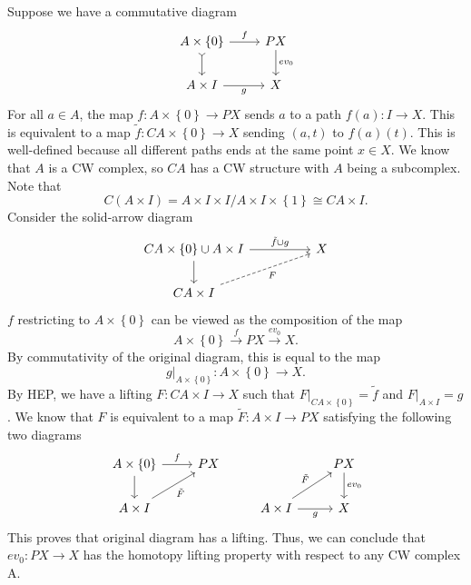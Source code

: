 \documentclass[letterpaper, 12pt]{article}
\begin{document}
\begin{solution}
Suppose we have a commutative diagram 
\[\begin{tikzcd}
	{A\times \left\{0\right\}} & PX \\
	{A\times I} & X
	\arrow["f", from=1-1, to=1-2]
	\arrow[tail, from=1-1, to=2-1]
	\arrow["{ev_0}", from=1-2, to=2-2]
	\arrow["g"', from=2-1, to=2-2]
\end{tikzcd}\]
For all \(a\in A\), the map \(f:A\times \left\{ 0 \right\}\rightarrow PX\) sends \(a\) to a path \(f(a):I\rightarrow X\). This is equivalent to a map \(\tilde{f}:CA\times \left\{ 0 \right\}\rightarrow X\) sending \((a,t)\) to \(f(a)(t)\). This is well-defined because all different paths ends at the same point \(x\in X\). We know that \(A\) is a CW complex, so \(CA\) has a CW structure with \(A\) being a subcomplex. Note that 
\[C(A\times I)=A\times I\times I/A\times I\times \left\{ 1 \right\}\cong CA\times I.\]
Consider the solid-arrow diagram 
\[\begin{tikzcd}
	{CA\times \left\{0\right\}\cup A\times I} && X \\
	{CA\times I}
	\arrow["{\tilde{f}\cup g}", from=1-1, to=1-3]
	\arrow[from=1-1, to=2-1]
	\arrow["F"', dashed, from=2-1, to=1-3]
\end{tikzcd}\]
\(f\) restricting to \(A\times \left\{ 0 \right\}\) can be viewed as the composition of the map 
\[A\times \left\{ 0 \right\}\xrightarrow{f}PX\xrightarrow{ev_0}X.\]
By commutativity of the original diagram, this is equal to the map 
\[g|_{A\times \left\{ 0 \right\}}:A\times \left\{ 0 \right\}\rightarrow X.\]
By HEP, we have a lifting \(F:CA\times I\rightarrow X\) such that \(F|_{CA\times \left\{ 0 \right\}}=\tilde{f}\) and \(F|_{A\times I}=g\). We know that \(F\) is equivalent to a map \(\tilde{F}:A\times I\rightarrow PX\) satisfying the following two diagrams
\[\begin{tikzcd}
	{A\times \left\{0\right\}} & PX && PX \\
	{A\times I} && {A\times I} & X
	\arrow["f", from=1-1, to=1-2]
	\arrow[from=1-1, to=2-1]
	\arrow["{ev_0}", from=1-4, to=2-4]
	\arrow["{\tilde{F}}"', from=2-1, to=1-2]
	\arrow["{\tilde{F}}", from=2-3, to=1-4]
	\arrow["g"', from=2-3, to=2-4]
\end{tikzcd}\]
This proves that original diagram has a lifting. Thus, we can conclude that \(ev_0:PX\rightarrow X\) has the homotopy lifting property with respect to any CW complex A. 
\end{solution}
\end{document}
